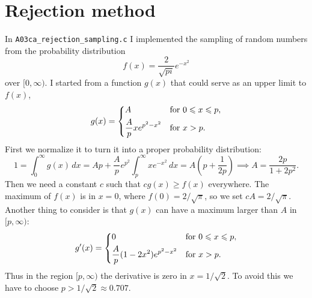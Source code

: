 \documentclass{gulartcl}
\begin{document}
\section{Rejection method}
In \texttt{A03ca\_rejection\_sampling.c} I implemented the sampling of random
numbers from the probability distribution
\begin{equation}
    f(x) = \frac{2}{\sqrt{pi}} e^{-x^{2}}
\end{equation}
over $[0, \infty)$. I started from a function $g(x)$ that could serve as an
upper limit to $f(x)$,
\begin{equation}
    g(x) =
    \begin{dcases}
        A & \text{for } 0 \leq x \leq p, \\
        \frac{A}{p}x e^{p^{2} - x^{2}} & \text{for } x > p.
    \end{dcases}
\end{equation}
First we normalize it to turn it into a proper probability distribution:
\begin{equation}
    1 = \int_{0}^{\infty} g(x) \, dx = Ap + \frac{A}{p}e^{p^{2}}
    \int_{p}^{\infty} x e^{-x^{2}} \, dx = A \left(p + \frac{1}{2p}\right)
    \implies A = \frac{2p}{1 + 2p^{2}}.
\end{equation}
Then we need a constant $c$ such that $c g(x) \geq f(x)$ everywhere. The maximum
of $f(x)$ is in $x = 0$, where $f(0) = 2 / \sqrt{\pi}$, so we set $c A = 2 /
\sqrt{\pi}$. Another thing to consider is that $g(x)$ can have a maximum larger
than $A$ in $[p, \infty)$:
\begin{equation}
    g'(x) = 
    \begin{dcases}
        0 & \text{for } 0 \leq x \leq p, \\
        \frac{A}{p}(1 - 2x^{2}) e^{p^{2} - x^{2}} & \text{for } x > p.
    \end{dcases}
\end{equation}
Thus in the region $[p, \infty)$ the derivative is zero in $x = 1 / \sqrt{2}$.
To avoid this we have to choose $p > 1 / \sqrt{2} \approx \num{0.707}$.
\end{document}
